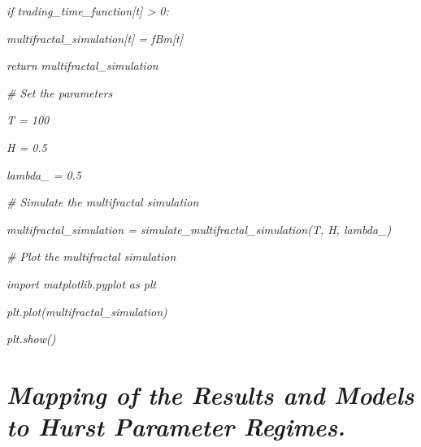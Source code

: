 \documentclass[12pt,a4paper]{report}
\numberwithin{equation}{section}
\begin{document}
\emph{if trading\_time\_function{[}t{]} \textgreater{} 0:}

\emph{multifractal\_simulation{[}t{]} = fBm{[}t{]}}

\emph{return multifractal\_simulation}

\emph{\# Set the parameters}

\emph{T = 100}

\emph{H = 0.5}

\emph{lambda\_ = 0.5}

\emph{\# Simulate the multifractal simulation}

\emph{multifractal\_simulation = simulate\_multifractal\_simulation(T,
H, lambda\_)}

\emph{\# Plot the multifractal simulation}

\emph{import matplotlib.pyplot as plt}

\emph{plt.plot(multifractal\_simulation)}

\emph{plt.show()}

\hypertarget{table--a1.--mapping--of--the--results--and--models--to--hurst--parameter--regimes.}{%
\section{\texorpdfstring{\emph{\textbf{Mapping of the Results
and Models to Hurst Parameter
Regimes.}}}{Mapping of the Results and Models to Hurst Parameter Regimes.}}\label{table--a1.--mapping--of--the--results--and--models--to--hurst--parameter--regimes.}}
\end{document}
